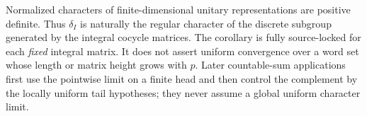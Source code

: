 Normalized characters of finite-dimensional unitary representations are
positive definite.  Thus \(\delta_I\) is naturally the regular character of
the discrete subgroup generated by the integral cocycle matrices.  The
corollary is fully source-locked for each \emph{fixed} integral matrix.  It
does not assert uniform convergence over a word set whose length or matrix
height grows with \(p\).  Later countable-sum applications first use the
pointwise limit on a finite head and then control the complement by the
locally uniform tail hypotheses; they never assume a global uniform
character limit.
